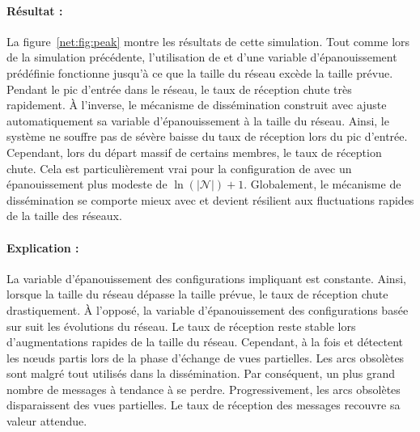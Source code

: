\paragraph{Résultat :} La figure~\ref{net:fig:peak} montre les résultats de
cette simulation. Tout comme lors de la simulation précédente, l'utilisation de
\CYCLON et d'une variable d'épanouissement prédéfinie fonctionne jusqu'à ce que
la taille du réseau excède la taille prévue. Pendant le pic d'entrée dans le
réseau, le taux de réception chute très rapidement. À l'inverse, le mécanisme de
dissémination construit avec \SPRAY ajuste automatiquement sa variable
d'épanouissement à la taille du réseau. Ainsi, le système ne souffre pas de
sévère baisse du taux de réception lors du pic d'entrée. Cependant, lors du
départ massif de certains membres, le taux de réception chute. Cela est
particulièrement vrai pour la configuration de \SPRAY avec un épanouissement
plus modeste de $\ln(|\mathcal{N}|)+1$. Globalement, le mécanisme de
dissémination se comporte mieux avec \SPRAY et devient résilient aux
fluctuations rapides de la taille des réseaux.

\paragraph{Explication :} La variable d'épanouissement des configurations
impliquant \CYCLON est constante. Ainsi, lorsque la taille du réseau dépasse la
taille prévue, le taux de réception chute drastiquement. À l'opposé, la variable
d'épanouissement des configurations basée sur \SPRAY suit les évolutions du
réseau. Le taux de réception reste stable lors d'augmentations rapides de la
taille du réseau. Cependant, à la fois \CYCLON et \SPRAY détectent les nœuds
partis lors de la phase d'échange de vues partielles. Les arcs obsolètes sont
malgré tout utilisés dans la dissémination. Par conséquent, un plus grand nombre
de messages à tendance à se perdre. Progressivement, les arcs obsolètes
disparaissent des vues partielles. Le taux de réception des messages recouvre sa
valeur attendue.

